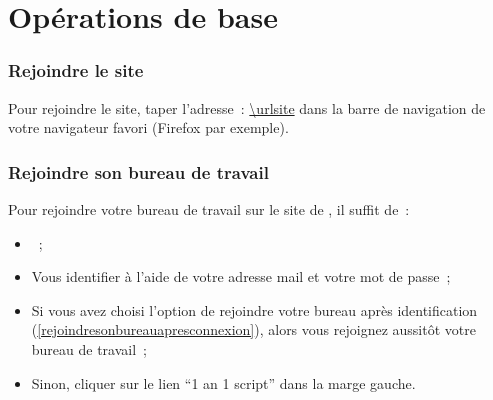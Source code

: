 \chapter{Opérations de base}\label{operationsdebase}

\subsection{Rejoindre le site}\label{rejoindrelesite}

Pour rejoindre le site, taper l'adresse~: {\url{\urlsite}} dans la barre de navigation de votre navigateur favori (Firefox par exemple).

\subsection{Rejoindre son bureau de travail} %
\label{rejoindrebureau}

Pour rejoindre votre bureau de travail sur le site de \boa{}, il suffit de~:

\begin{itemize}
  \item \rejoindreLeSite{}~;
  \item Vous identifier à l'aide de votre adresse mail et votre mot de passe~;
  \item Si vous avez choisi l'option de rejoindre votre bureau après identification (\ref{rejoindresonbureauapresconnexion}), alors vous rejoignez aussitôt votre bureau de travail~;
  \item Sinon, cliquer sur le lien \enquote{1 an 1 script} dans la marge gauche.
\end{itemize}